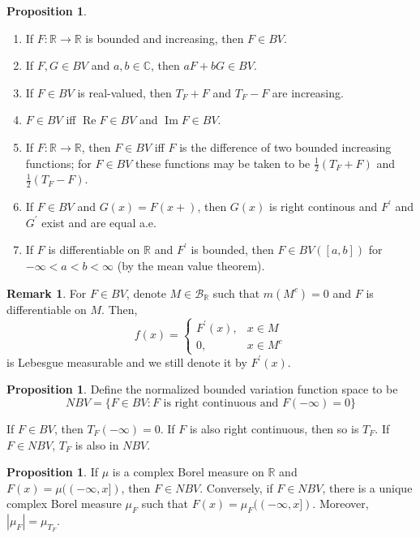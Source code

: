 \documentclass[12pt,a4paper]{book}
\newcommand{\bb}[1]{\mathbb{#1}}
\newcommand{\p}{^{\prime}}
\newenvironment{enu}{\begin{enumerate}[(1)]}{\end{enumerate}}
\theoremstyle{definition}
\newtheorem{rema}[defn]{Remark}
\newtheorem{prop}[defn]{Proposition}
\begin{document}
\begin{prop}
    \begin{enu}
        \item If $F: \mathbb{R} \rightarrow \mathbb{R}$ is bounded and increasing, then $F \in B V$.
        \item If $F, G \in B V$ and $a, b \in \mathbb{C}$, then $a F+b G \in B V$.
        \item If $F \in B V$ is real-valued, then $T_F+F$ and $T_F-F$ are increasing.
        \item $F \in B V$ iff $\operatorname{Re} F \in B V$ and $\operatorname{Im} F \in B V$. 
        \item If $F: \mathbb{R} \rightarrow \mathbb{R}$, then $F \in B V$ iff $F$ is the difference of two bounded increasing functions; for $F \in B V$ these functions may be taken to be $\frac{1}{2}\left(T_F+F\right)$ and $\frac{1}{2}\left(T_F-F\right)$.
        \item If $F \in B V$ and $G(x)=F(x+)$, then $G(x)$ is right continous and 
        $F^{\prime}$ and $G^{\prime}$ exist and are equal a.e.
        \item If $F$ is differentiable on $\mathbb{R}$ and $F^{\prime}$ is bounded, then $F \in B V([a, b])$ for $-\infty<a<b<\infty$ (by the mean value theorem).
    \end{enu}
\end{prop}
\begin{rema}
    For $F\in BV$, denote $M\in \mathcal{B}_\bb{R}$ such that $m(M^c)=0$ and $F$ is differentiable on $M$. Then, 
    \begin{equation*}
        f(x)=\begin{cases}
            F\p(x), & x\in M \\ 
            0,      & x\in M^c
        \end{cases}
    \end{equation*}
    is Lebesgue measurable and we still denote it by $F\p(x)$.
\end{rema}
\begin{prop}
    Define the normalized bounded variation function space to be
    $$
        NBV=\{F \in B V: F \text { is right continuous and } F(-\infty)=0\}
    $$

    If $F \in B V$, then $T_F(-\infty)=0$. If $F$ is also right continuous, then so is $T_F$.
    If $F\in NBV$, $T_F$ is also in $NBV$.
\end{prop}
\begin{prop}
    If $\mu$ is a complex Borel measure on $\mathbb{R}$ and $F(x)=\mu((-\infty, x])$, then $F \in N B V$. Conversely, if $F \in N B V$, there is a unique complex Borel measure $\mu_F$ such that $F(x)=\mu_F((-\infty, x])$.
    Moreover, $\left|\mu_F\right|=\mu_{T_F}$.
\end{prop}
\end{document}
